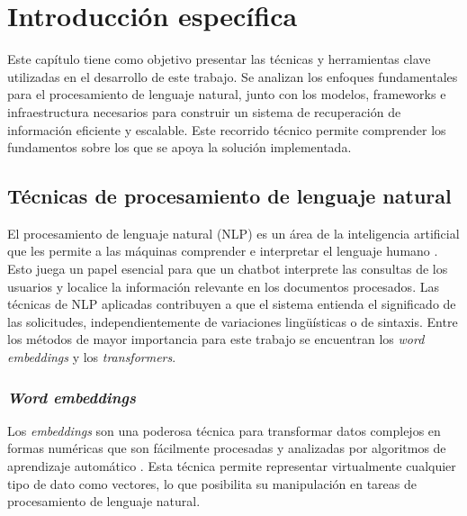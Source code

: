 \chapter{Introducción específica} %

\label{Chapter2}


Este capítulo tiene como objetivo presentar las técnicas y herramientas clave utilizadas en el 
desarrollo de este trabajo. Se analizan los enfoques fundamentales para el procesamiento de 
lenguaje natural, junto con los modelos, frameworks e infraestructura necesarios para 
construir un sistema de recuperación de información eficiente y escalable. Este recorrido 
técnico permite comprender los fundamentos sobre los que se apoya la solución implementada. 

\section{Técnicas de procesamiento de lenguaje natural}

El procesamiento de lenguaje natural (NLP) es un área de la inteligencia artificial que les permite 
a las máquinas comprender e interpretar el lenguaje humano \citep{book:nlp}. Esto juega un papel esencial 
para que un chatbot interprete las consultas de los usuarios y localice la información relevante en los 
documentos procesados. Las técnicas de NLP aplicadas contribuyen a que el sistema entienda el 
significado de las solicitudes, independientemente de variaciones lingüísticas o de sintaxis. Entre los 
métodos de mayor importancia para este trabajo se encuentran los \textit{word embeddings} y los
\textit{transformers}.

\subsection{\textit{Word embeddings}}

Los \textit{embeddings} son una poderosa técnica para transformar datos complejos en formas numéricas que 
son fácilmente procesadas y analizadas por algoritmos de aprendizaje automático \citep{paper:embeddings}. Esta técnica permite 
representar virtualmente cualquier tipo de dato como vectores, lo que posibilita su manipulación en tareas de 
procesamiento de lenguaje natural.


